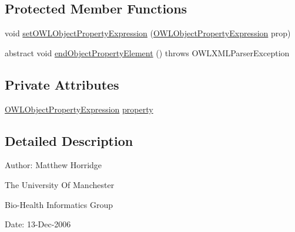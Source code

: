 \subsection*{Protected Member Functions}
\begin{DoxyCompactItemize}
\item 
void \hyperlink{classorg_1_1coode_1_1owlapi_1_1owlxmlparser_1_1_abstract_o_w_l_object_property_element_handler_a8bde6f1f41233b7c091f9f809d82f7ce}{set\-O\-W\-L\-Object\-Property\-Expression} (\hyperlink{interfaceorg_1_1semanticweb_1_1owlapi_1_1model_1_1_o_w_l_object_property_expression}{O\-W\-L\-Object\-Property\-Expression} prop)
\item 
abstract void \hyperlink{classorg_1_1coode_1_1owlapi_1_1owlxmlparser_1_1_abstract_o_w_l_object_property_element_handler_a6346d0c788ceeba550883282c12deeb1}{end\-Object\-Property\-Element} ()  throws O\-W\-L\-X\-M\-L\-Parser\-Exception
\end{DoxyCompactItemize}
\subsection*{Private Attributes}
\begin{DoxyCompactItemize}
\item 
\hyperlink{interfaceorg_1_1semanticweb_1_1owlapi_1_1model_1_1_o_w_l_object_property_expression}{O\-W\-L\-Object\-Property\-Expression} \hyperlink{classorg_1_1coode_1_1owlapi_1_1owlxmlparser_1_1_abstract_o_w_l_object_property_element_handler_abba8dd1e5368df58498990b1d16fce13}{property}
\end{DoxyCompactItemize}


\subsection{Detailed Description}
Author\-: Matthew Horridge\par
 The University Of Manchester\par
 Bio-\/\-Health Informatics Group\par
 Date\-: 13-\/\-Dec-\/2006\par
\par
 

